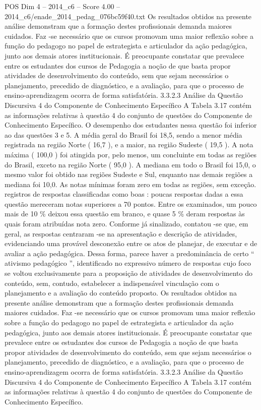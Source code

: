 \begin{textsample}{POS Dim 4 – 2014\_c6 – Score 4.00 – 2014\_c6/enade\_2014\_pedag\_076bc59f40.txt}
Os resultados obtidos na presente análise demonstram que a formação destes profissionais demanda maiores cuidados.
Faz -se necessário que os cursos promovam uma maior reflexão sobre a função do pedagogo no papel de estrategista e articulador da ação pedagógica, junto aos demais atores institucionais.
É preocupante constatar que prevalece entre os estudantes dos cursos de Pedagogia a noção de que basta propor atividades de desenvolvimento do conteúdo, sem que sejam necessários o planejamento, precedido de diagnóstico, e a avaliação, para que o processo de ensino-aprendizagem ocorra de forma satisfatória. 3.3.2.3 Análise da Questão Discursiva 4 do Componente de Conhecimento Específico A Tabela 3.17 contém as informações relativas à questão 4 do conjunto de questões do Componente de Conhecimento Específico.
O desempenho dos estudantes nessa questão foi inferior ao das questões 3 e 5.
A média geral do Brasil foi 18,5, sendo a menor média registrada na região Norte ( 16,7 ), e a maior, na região Sudeste ( 19,5 ).
A nota máxima ( 100,0 ) foi atingida por, pelo menos, um concluinte em todas as regiões do Brasil, exceto na região Norte ( 95,0 ).
A mediana em todo o Brasil foi 15,0, o mesmo valor foi obtido nas regiões Sudeste e Sul, enquanto nas demais regiões a mediana foi 10,0.
As notas mínimas foram zero em todas as regiões, sem exceção. registros de respostas classificadas como boas : poucas respostas dadas a essa questão mereceram notas superiores a 70 pontos.
Entre os examinados, um pouco mais de 10 \% deixou essa questão em branco, e quase 5 \% deram respostas às quais foram atribuídas nota zero.
Conforme já sinalizado, contatou -se que, em geral, as respostas centraram -se na apresentação e descrição de atividades, evidenciando uma provável desconexão entre os atos de planejar, de executar e de avaliar a ação pedagógica.
Dessa forma, parece haver a predominância de certo “ ativismo pedagógico ”, identificado no expressivo número de respostas cujo foco se voltou exclusivamente para a proposição de atividades de desenvolvimento do conteúdo, sem, contudo, estabelecer a indispensável vinculação com o planejamento e a avaliação do conteúdo proposto.
Os resultados obtidos na presente análise demonstram que a formação destes profissionais demanda maiores cuidados.
Faz -se necessário que os cursos promovam uma maior reflexão sobre a função do pedagogo no papel de estrategista e articulador da ação pedagógica, junto aos demais atores institucionais.
É preocupante constatar que prevalece entre os estudantes dos cursos de Pedagogia a noção de que basta propor atividades de desenvolvimento do conteúdo, sem que sejam necessários o planejamento, precedido de diagnóstico, e a avaliação, para que o processo de ensino-aprendizagem ocorra de forma satisfatória. 3.3.2.3 Análise da Questão Discursiva 4 do Componente de Conhecimento Específico A Tabela 3.17 contém as informações relativas à questão 4 do conjunto de questões do Componente de Conhecimento Específico.

\end{textsample}

